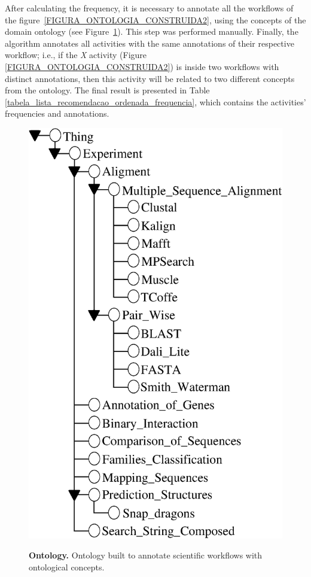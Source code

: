 \documentclass{doublecol-new}
\theoremstyle{TH}{
\newtheorem{lemma}{Lemma}
\newtheorem{theorem}[lemma]{Theorem}
\newtheorem{corrolary}[lemma]{Corrolary}
\newtheorem{conjecture}[lemma]{Conjecture}
\newtheorem{proposition}[lemma]{Proposition}
\newtheorem{claim}[lemma]{Claim}
\newtheorem{stheorem}[lemma]{Wrong Theorem}
\newtheorem{algorithm}{Algorithm}
}
\theoremstyle{THrm}{
\newtheorem{definition}{Definition}[section]
\newtheorem{question}{Question}[section]
\newtheorem{remark}{Remark}
\newtheorem{scheme}{Scheme}
}
\theoremstyle{THhit}{
\newtheorem{case}{Case}[section]
}
\begin{document}
After calculating the frequency, it is necessary to annotate all the workflows of the figure~\ref{FIGURA_ONTOLOGIA_CONSTRUIDA2}, using the concepts of the domain ontology (see Figure~\ref{FIGURA_ONTOLOGIA_CONSTRUIDA}). This step was performed manually. Finally, the algorithm annotates all activities with the same annotations of their respective workflow; i.e., if the \emph{X} activity (Figure \ref{FIGURA_ONTOLOGIA_CONSTRUIDA2}) is inside two workflows with distinct annotations, then this activity will be related to two different concepts from the ontology. The final result is presented in Table \ref{tabela_lista_recomendacao_ordenada_frequencia}, which contains the activities' frequencies and annotations.
\begin{figure}[!htb]
	\centering
	\caption{{\bf Ontology.} Ontology built to annotate scientific workflows with ontological concepts.}
	\includegraphics[scale = 0.3]{./pics/ontologia.eps}
	\label{FIGURA_ONTOLOGIA_CONSTRUIDA}
\end{figure}
\end{document}
